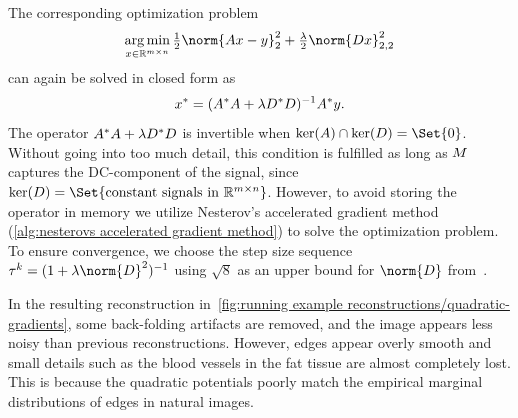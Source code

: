 The corresponding optimization problem
\begin{equation}
	\argmin_{\Signal \in \R^{\Height \times \Width}} \Half \norm{\Forward\Signal - \Data}_{\num{2}}^{\num{2}} + \tfrac{\lambda}{2}\norm{\DiffOp\Signal}_{\num{2},\num{2}}^{\num{2}}
\end{equation}
can again be solved in closed form as
\begin{equation}
	{x}^\ast = (A^{\ast}A + \lambda D^{\ast}D)^{-1}A^{\ast}y.
\end{equation}
The operator \( A^{\ast}A + \lambda D^{\ast}D \) is invertible when \( \ker(\Forward) \cap \ker(\DiffOp) = \Set{0} \).
Without going into too much detail, this condition is fulfilled as long as \( M \) captures the DC-component of the signal, since \( \ker(\DiffOp) = \Set{\text{constant signals in}\ \R^{\Height \times \Width}} \).
However, to avoid storing the operator in memory we utilize Nesterov's accelerated gradient method (\cref{alg:nesterovs accelerated gradient method}) to solve the optimization problem.
To ensure convergence, we choose the step size sequence \( \tau^k = (\num{1} + \lambda\norm{\DiffOp}^{\num{2}})^{-1} \) using \(\sqrt{\num{8}} \) as an upper bound for \( \norm{D} \) from~\cite{chambolle_algorithm_2004}.

In the resulting reconstruction in~\cref{fig:running example reconstructions/quadratic-gradients}, some back-folding artifacts are removed, and the image appears less noisy than previous reconstructions.
However, edges appear overly smooth and small details such as the blood vessels in the fat tissue are almost completely lost.
This is because the quadratic potentials poorly match the empirical marginal distributions of edges in natural images.

